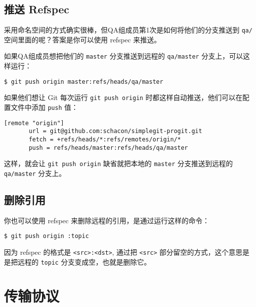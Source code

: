 \documentclass[a4paper]{book}
\begin{document}
\subsection{推送 Refspec}

采用命名空间的方式确实很棒，但QA组成员第1次是如何将他们的分支推送到 \texttt{qa/} 空间里面的呢？答案是你可以使用 refspec 来推送。

如果QA组成员想把他们的 \texttt{master} 分支推送到远程的 \texttt{qa/master} 分支上，可以这样运行：

\begin{shaded}\begin{verbatim}
$ git push origin master:refs/heads/qa/master
\end{verbatim}\end{shaded}

如果他们想让 Git 每次运行 \texttt{git push origin} 时都这样自动推送，他们可以在配置文件中添加 \texttt{push} 值：

\begin{shaded}\begin{verbatim}
[remote "origin"]
       url = git@github.com:schacon/simplegit-progit.git
       fetch = +refs/heads/*:refs/remotes/origin/*
       push = refs/heads/master:refs/heads/qa/master
\end{verbatim}\end{shaded}

这样，就会让 \texttt{git push origin} 缺省就把本地的 \texttt{master} 分支推送到远程的 \texttt{qa/master} 分支上。

\subsection{删除引用}

你也可以使用 refspec 来删除远程的引用，是通过运行这样的命令：

\begin{shaded}\begin{verbatim}
$ git push origin :topic
\end{verbatim}\end{shaded}

因为 refspec 的格式是 \texttt{\textless{}src\textgreater{}:\textless{}dst\textgreater{}}, 通过把 \texttt{\textless{}src\textgreater{}} 部分留空的方式，这个意思是是把远程的 \texttt{topic} 分支变成空，也就是删除它。

\section{传输协议}
\end{document}
